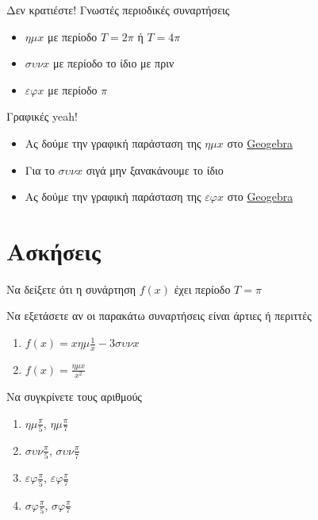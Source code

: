 \documentclass{presentation}
\begin{document}
\begin{frame}{Δεν κρατιέστε!}
  Γνωστές περιοδικές συναρτήσεις
  \begin{itemize}
    \item<1-> $ημx$ με περίοδο  $Τ=2π$  ή $Τ=4π$
    \item<4-> $συνx$ με περίοδο  το ίδιο με πριν
    \item<6-> $εφx$ με περίοδο  $π$
  \end{itemize}
\end{frame}

\begin{frame}{Γραφικές yeah!}
  \begin{itemize}
    \item<1-> Ας δούμε την γραφική παράσταση της $ημx$ στο \href{https://www.geogebra.org/m/jvvwgvru}{Geogebra}
    \item<2-> Για το $συνx$ σιγά μην ξανακάνουμε το ίδιο
    \item<3-> Ας δούμε την γραφική παράσταση της $εφx$ στο \href{https://www.geogebra.org/m/qmk7cmh2}{Geogebra}
  \end{itemize}
\end{frame}

\section{Ασκήσεις}
\begin{askisi}
  Να δείξετε ότι η συνάρτηση $f(x)$ έχει περίοδο $Τ=π$
\end{askisi}

\begin{askisi}
  Να εξετάσετε αν οι παρακάτω συναρτήσεις είναι άρτιες ή περιττές
  \begin{enumerate}
    \item<1-> $f(x)=xημ\frac{1}{x}-3συνx$
    \item<2-> $f(x)=\frac{ημx}{x^2}$
  \end{enumerate}
\end{askisi}

\begin{askisi}
  Να συγκρίνετε τους αριθμούς
  \begin{enumerate}
    \item<1-> $ημ\frac{π}{5}$, $ημ\frac{π}{7}$
    \item<2-> $συν\frac{π}{5}$, $συν\frac{π}{7}$
    \item<3-> $εφ\frac{π}{5}$, $εφ\frac{π}{7}$
    \item<4-> $σφ\frac{π}{5}$, $σφ\frac{π}{7}$
  \end{enumerate}
\end{askisi}
\end{document}
